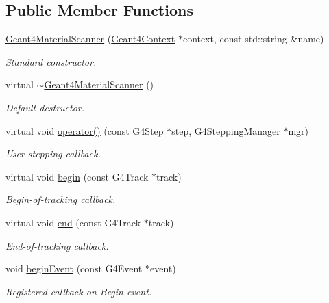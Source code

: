 \subsection*{Public Member Functions}
\begin{DoxyCompactItemize}
\item 
\hyperlink{class_d_d4hep_1_1_simulation_1_1_geant4_material_scanner_ab91cbd7d8fe29498eacee9be0f95b6d1}{Geant4MaterialScanner} (\hyperlink{class_d_d4hep_1_1_simulation_1_1_geant4_context}{Geant4Context} $\ast$context, const std::string \&name)
\begin{DoxyCompactList}\small\item\em Standard constructor. \item\end{DoxyCompactList}\item 
virtual \hyperlink{class_d_d4hep_1_1_simulation_1_1_geant4_material_scanner_af31f21a00b4c9cab1a73aeddb1a3773b}{$\sim$Geant4MaterialScanner} ()
\begin{DoxyCompactList}\small\item\em Default destructor. \item\end{DoxyCompactList}\item 
virtual void \hyperlink{class_d_d4hep_1_1_simulation_1_1_geant4_material_scanner_abd897a6b73a1855f674962d0e6126c17}{operator()} (const G4Step $\ast$step, G4SteppingManager $\ast$mgr)
\begin{DoxyCompactList}\small\item\em User stepping callback. \item\end{DoxyCompactList}\item 
virtual void \hyperlink{class_d_d4hep_1_1_simulation_1_1_geant4_material_scanner_adb6b4a72be62b6b7c440db01d147d7e1}{begin} (const G4Track $\ast$track)
\begin{DoxyCompactList}\small\item\em Begin-\/of-\/tracking callback. \item\end{DoxyCompactList}\item 
virtual void \hyperlink{class_d_d4hep_1_1_simulation_1_1_geant4_material_scanner_a08dd7d2ac6bece93af5709c1c2edc64c}{end} (const G4Track $\ast$track)
\begin{DoxyCompactList}\small\item\em End-\/of-\/tracking callback. \item\end{DoxyCompactList}\item 
void \hyperlink{class_d_d4hep_1_1_simulation_1_1_geant4_material_scanner_af8c21aaac99b7f654c98f83a3382c9f4}{beginEvent} (const G4Event $\ast$event)
\begin{DoxyCompactList}\small\item\em Registered callback on Begin-\/event. \item\end{DoxyCompactList}\end{DoxyCompactItemize}
